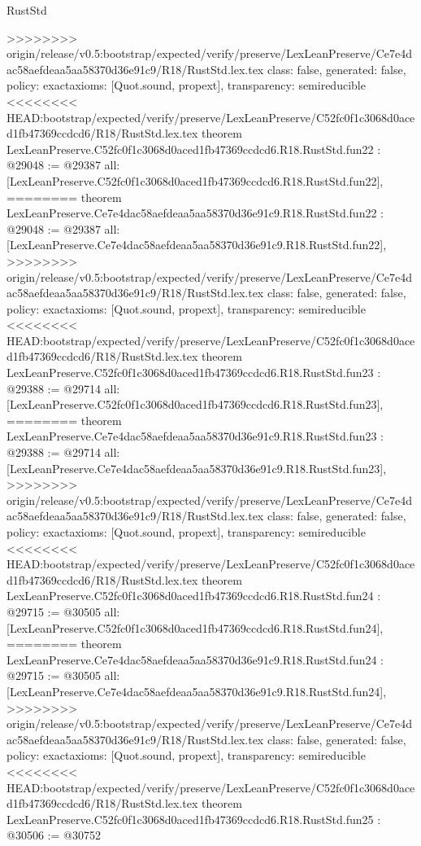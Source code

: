 \begin{lexlean}{RustStd}
\begin{coremodule}
{\begin{coremodule}
{{{{{{{{{{{{{{{{{{{{{{{{{>>>>>>>> origin/release/v0.5:bootstrap/expected/verify/preserve/LexLeanPreserve/Ce7e4dac58aefdeaa5aa58370d36e91c9/R18/RustStd.lex.tex
  class: false,
  generated: false,
  policy: exact{axioms: [Quot.sound, propext]},
  transparency: semireducible
}
<<<<<<<< HEAD:bootstrap/expected/verify/preserve/LexLeanPreserve/C52fc0f1c3068d0aced1fb47369ccdcd6/R18/RustStd.lex.tex
theorem LexLeanPreserve.C52fc0f1c3068d0aced1fb47369ccdcd6.R18.RustStd.fun22 : @29048 := @29387 {
  all: [LexLeanPreserve.C52fc0f1c3068d0aced1fb47369ccdcd6.R18.RustStd.fun22],
========
theorem LexLeanPreserve.Ce7e4dac58aefdeaa5aa58370d36e91c9.R18.RustStd.fun22 : @29048 := @29387 {
  all: [LexLeanPreserve.Ce7e4dac58aefdeaa5aa58370d36e91c9.R18.RustStd.fun22],
>>>>>>>> origin/release/v0.5:bootstrap/expected/verify/preserve/LexLeanPreserve/Ce7e4dac58aefdeaa5aa58370d36e91c9/R18/RustStd.lex.tex
  class: false,
  generated: false,
  policy: exact{axioms: [Quot.sound, propext]},
  transparency: semireducible
}
<<<<<<<< HEAD:bootstrap/expected/verify/preserve/LexLeanPreserve/C52fc0f1c3068d0aced1fb47369ccdcd6/R18/RustStd.lex.tex
theorem LexLeanPreserve.C52fc0f1c3068d0aced1fb47369ccdcd6.R18.RustStd.fun23 : @29388 := @29714 {
  all: [LexLeanPreserve.C52fc0f1c3068d0aced1fb47369ccdcd6.R18.RustStd.fun23],
========
theorem LexLeanPreserve.Ce7e4dac58aefdeaa5aa58370d36e91c9.R18.RustStd.fun23 : @29388 := @29714 {
  all: [LexLeanPreserve.Ce7e4dac58aefdeaa5aa58370d36e91c9.R18.RustStd.fun23],
>>>>>>>> origin/release/v0.5:bootstrap/expected/verify/preserve/LexLeanPreserve/Ce7e4dac58aefdeaa5aa58370d36e91c9/R18/RustStd.lex.tex
  class: false,
  generated: false,
  policy: exact{axioms: [Quot.sound, propext]},
  transparency: semireducible
}
<<<<<<<< HEAD:bootstrap/expected/verify/preserve/LexLeanPreserve/C52fc0f1c3068d0aced1fb47369ccdcd6/R18/RustStd.lex.tex
theorem LexLeanPreserve.C52fc0f1c3068d0aced1fb47369ccdcd6.R18.RustStd.fun24 : @29715 := @30505 {
  all: [LexLeanPreserve.C52fc0f1c3068d0aced1fb47369ccdcd6.R18.RustStd.fun24],
========
theorem LexLeanPreserve.Ce7e4dac58aefdeaa5aa58370d36e91c9.R18.RustStd.fun24 : @29715 := @30505 {
  all: [LexLeanPreserve.Ce7e4dac58aefdeaa5aa58370d36e91c9.R18.RustStd.fun24],
>>>>>>>> origin/release/v0.5:bootstrap/expected/verify/preserve/LexLeanPreserve/Ce7e4dac58aefdeaa5aa58370d36e91c9/R18/RustStd.lex.tex
  class: false,
  generated: false,
  policy: exact{axioms: [Quot.sound, propext]},
  transparency: semireducible
}
<<<<<<<< HEAD:bootstrap/expected/verify/preserve/LexLeanPreserve/C52fc0f1c3068d0aced1fb47369ccdcd6/R18/RustStd.lex.tex
theorem LexLeanPreserve.C52fc0f1c3068d0aced1fb47369ccdcd6.R18.RustStd.fun25 : @30506 := @30752 {
}}}}}}}}}}}}}}}}}}}}}}}}}}}}
\end{coremodule}}
\end{coremodule}
\end{lexlean}
